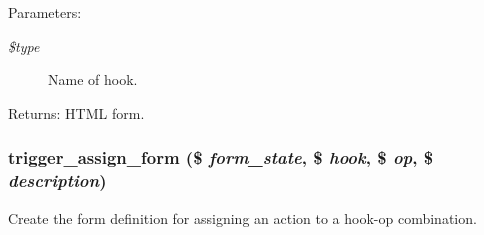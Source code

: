 \begin{Desc}
\item[Parameters:]
\begin{description}
\item[{\em \$type}]Name of hook. \end{description}
\end{Desc}
\begin{Desc}
\item[Returns:]HTML form. \end{Desc}
\hypertarget{trigger_8admin_8inc_cf100bfaaa96b66189c785d7a7d54dae}{
\subsubsection[{trigger\_\-assign\_\-form}]{\setlength{\rightskip}{0pt plus 5cm}trigger\_\-assign\_\-form (\$ {\em form\_\-state}, \/  \$ {\em hook}, \/  \$ {\em op}, \/  \$ {\em description})}}
\label{trigger_8admin_8inc_cf100bfaaa96b66189c785d7a7d54dae}


Create the form definition for assigning an action to a hook-op combination.

